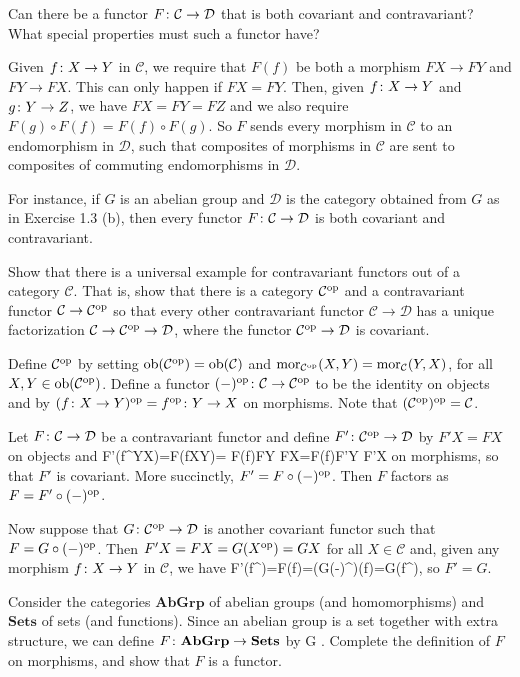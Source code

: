 \bx
Can there be a functor $F \colon \mathcal{C} \to \mathcal{D}$ that is both covariant and contravariant? What special properties must such a functor have?
\ex

\bs
Given $f\colon X\to Y$ in $\mathcal{C}$, we require that $F(f)$ be both a morphism $FX\to FY$ and $FY\to FX$. This can only happen if $FX=FY$. Then, given $f\colon X\to Y$ and $g\colon Y\to Z$, we have $FX=FY=FZ$ and we also require $F(g)\circ F(f)=F(f)\circ F(g)$. So $F$ sends every morphism in $\mathcal{C}$ to an endomorphism in $\mathcal{D}$, such that composites of morphisms in $\mathcal{C}$ are sent to composites of commuting endomorphisms in $\mathcal{D}$.

For instance, if $G$ is an abelian group and $\mathcal{D}$ is the category obtained from $G$ as in Exercise 1.3 (b), then every functor $F\colon \mathcal{C}\to \mathcal{D}$ is both covariant and contravariant.
\es

\bx
Show that there is a universal example for contravariant functors out of a category $\mathcal{C}$. That is, show that there is a category $\mathcal{C}^{\mathrm{op}}$ and a contravariant functor $\mathcal{C} \to \mathcal{C}^{\mathrm{op}}$ so that every other contravariant functor $\mathcal{C} \to \mathcal{D}$ has a unique factorization $\mathcal{C} \to \mathcal{C}^{\mathrm{op}} \to \mathcal{D}$, where the functor $\mathcal{C}^{\mathrm{op}} \to\mathcal{D}$ is covariant.
\ex

\bs
Define $\mathcal{C}^{\mathrm{op}}$ by setting $\operatorname{ob}(\mathcal{C}^{\mathrm{op}})=\operatorname{ob}(\mathcal{C})$ and $\operatorname{mor}_{\mathcal{C}^{\mathrm{op}}}(X,Y)=\operatorname{mor}_{\mathcal{C}}(Y,X)$, for all $X,Y\in\operatorname{ob}(\mathcal{C}^{\mathrm{op}})$. Define a functor $(-)^{\mathrm{op}}\colon \mathcal{C}\to \mathcal{C}^{\mathrm{op}}$ to be the identity on objects and by $(f\colon X\to Y)^{\mathrm{op}}=f^{\mathrm{op}}\colon Y\to X$ on morphisms. Note that $(\mathcal{C}^{\mathrm{op}})^{\mathrm{op}}=\mathcal{C}$.

Let $F\colon \mathcal{C}\to \mathcal{D}$ be a contravariant functor and define $F'\colon\mathcal{C}^{\mathrm{op}}\to\mathcal{D}$ by $F'X=FX$ on objects and
\bse
F'(f^\op\cl Y\to X)=F(f\cl X\to Y)= F(f)\cl FY \to FX=F(f)\cl F'Y \to F'X
\ese
on morphisms, so that $F'$ is covariant. More succinctly, $F'=F\circ(-)^{\mathrm{op}}$. Then $F$ factors as $F=F'\circ(-)^{\mathrm{op}}$.

Now suppose that $G\colon \mathcal{C}^{\mathrm{op}}\to\mathcal{D}$ is another covariant functor such that $F=G\circ(-)^{\mathrm{op}}$. Then $F'X=FX=G(X^{\mathrm{op}})=GX$ for all $X\in \mathcal{C}$ and, given any morphism $f\colon X\to Y$ in $\mathcal{C}$, we have
\bse
F'(f^\op)=F(f)=(G\circ(-)^\op)(f)=G(f^\op),
\ese
so $F'=G$.
\es

\bx
Consider the categories $\mathbf{AbGrp}$ of abelian groups (and homomorphisms) and $\mathbf{Sets}$ of sets (and functions). Since an abelian group is a set together with extra structure, we can define $F \colon \mathbf{AbGrp} \to\mathbf{Sets}$ by
\bse
G \longmapsto {}.
\ese
Complete the definition of $F$ on morphisms, and show that $F$ is a functor.
\ex

